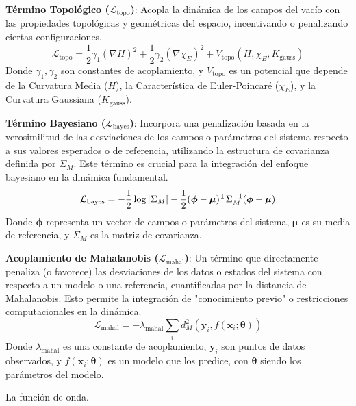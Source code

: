 \documentclass{book}
\begin{document}
\textbf{Término Topológico ($\mathcal{L}_{\text{topo}}$)}: Acopla la dinámica de los campos del vacío con las propiedades topológicas y geométricas del espacio, incentivando o penalizando ciertas configuraciones.
\begin{equation}
    \mathcal{L}_{\text{topo}}=\frac{1}{2}\gamma_1(\nabla H)^2+\frac{1}{2}\gamma_2(\nabla\chi_E)^2+V_{\text{topo}}(H,\chi_E,K_{\text{gauss}})
\end{equation}
Donde $\gamma_1,\gamma_2$ son constantes de acoplamiento, y $V_{\text{topo}}$ es un potencial que depende de la Curvatura Media ($H$), la Característica de Euler-Poincaré ($\chi_E$), y la Curvatura Gaussiana ($K_{\text{gauss}}$).

\textbf{Término Bayesiano ($\mathcal{L}_{\text{bayes}}$)}: Incorpora una penalización basada en la verosimilitud de las desviaciones de los campos o parámetros del sistema respecto a sus valores esperados o de referencia, utilizando la estructura de covarianza definida por $\Sigma_M$. Este término es crucial para la integración del enfoque bayesiano en la dinámica fundamental.
\begin{equation}
    \mathcal{L}_{\text{bayes}}=-\frac{1}{2}\log\abs{\Sigma_M}-\frac{1}{2}(\boldsymbol{\phi}-\boldsymbol{\mu})^{\mathrm{T}}\Sigma_M^{-1}(\boldsymbol{\phi}-\boldsymbol{\mu})
\end{equation}
Donde $\boldsymbol{\phi}$ representa un vector de campos o parámetros del sistema, $\boldsymbol{\mu}$ es su media de referencia, y $\Sigma_M$ es la matriz de covarianza.

\textbf{Acoplamiento de Mahalanobis ($\mathcal{L}_{\text{mahal}}$)}: Un término que directamente penaliza (o favorece) las desviaciones de los datos o estados del sistema con respecto a un modelo o una referencia, cuantificadas por la distancia de Mahalanobis. Esto permite la integración de "conocimiento previo" o restricciones computacionales en la dinámica.
\begin{equation}
    \mathcal{L}_{\text{mahal}}=-\lambda_{\text{mahal}}\sum_i d_M^2(\mathbf{y}_i,f(\mathbf{x}_i;\boldsymbol{\theta}))
\end{equation}
Donde $\lambda_{\text{mahal}}$ es una constante de acoplamiento, $\mathbf{y}_i$ son puntos de datos observados, y $f(\mathbf{x}_i;\boldsymbol{\theta})$ es un modelo que los predice, con $\boldsymbol{\theta}$ siendo los parámetros del modelo.

La función de onda.
\end{document}

